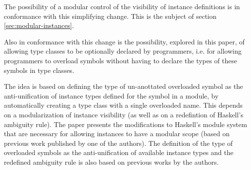 The possibility of a modular control of the visibility of instance
definitions is in conformance with this simplifying change. This is
the subject of section \ref{sec:modular-instances}.

Also in conformance with this change is the possibility, explored in
this paper, of allowing type classes to be optionally declared by
programmers, i.e. for allowing programmers to overload symbols without
having to declare the types of these symbols in type classes.

The idea is based on defining the type of un-anottated overloaded
symbol as the anti-unification of instance types defined for the
symbol in a module, by automatically creating a type class with a
single overloaded name. This depends on a modularization of instance
visibility (as well as on a redefintion of Haskell's ambiguity rule).
The paper presents the modifications to Haskell's module system that
are necessary for allowing instances to have a modular scope (based on
previous work published by one of the authors). The definition of the
type of overloaded symbols as the anti-unification of available
instance types and the redefined ambiguity rule is also based on
previous works by the authors. 

